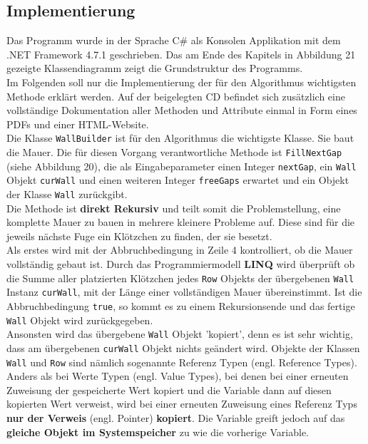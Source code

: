 \documentclass[a4paper,12pt]{article}
\newcommand{\code}{\texttt}
\begin{document}
\subsection{Implementierung}
Das Programm wurde in der Sprache C\# als Konsolen Applikation mit dem .NET Framework 4.7.1 geschrieben.
Das am Ende des Kapitels in Abbildung 21 gezeigte Klassendiagramm zeigt die Grundstruktur des Programms.
\\[0.4cm]
Im Folgenden soll nur die Implementierung der für den Algorithmus wichtigsten Methode erklärt werden. Auf der beigelegten CD befindet sich zusätzlich eine vollständige Dokumentation aller Methoden und Attribute einmal in Form eines PDFs und einer HTML-Website.
\\[0.4cm]
Die Klasse \code{WallBuilder} ist für den Algorithmus die wichtigste Klasse. Sie baut die Mauer. Die für diesen Vorgang verantwortliche Methode ist \code{FillNextGap} (siehe Abbildung 20), die als Eingabeparameter einen Integer \code{nextGap}, ein \code{Wall} Objekt \code{curWall} und einen weiteren Integer \code{freeGaps} erwartet und ein Objekt der Klasse \code{Wall} zurückgibt.
\\[0.4cm]
Die Methode ist \textbf{direkt Rekursiv} und teilt somit die Problemstellung, eine komplette Mauer zu bauen in mehrere kleinere Probleme auf. Diese sind für die jeweils nächste Fuge ein Klötzchen zu finden, der sie besetzt.
\\[0.4cm]
Als erstes wird mit der Abbruchbedingung in Zeile 4 kontrolliert, ob die Mauer vollständig gebaut ist. Durch das Programmiermodell \textbf{LINQ} wird überprüft ob die Summe aller platzierten Klötzchen jedes \code{Row} Objekts der übergebenen \code{Wall} Instanz \code{curWall}, mit der Länge einer vollständigen Mauer übereinstimmt.
Ist die Abbruchbedingung \code{true}, so kommt es zu einem Rekursionsende und das fertige \code{Wall} Objekt wird zurückgegeben.
\\[0.4cm]
Ansonsten wird das übergebene \code{Wall} Objekt 'kopiert', denn es ist sehr wichtig, dass am übergebenen \code{curWall} Objekt nichts geändert wird. Objekte der Klassen \code{Wall} und \code{Row} sind nämlich sogenannte Referenz Typen (engl. Reference Types). Anders als bei Werte Typen (engl. Value Types), bei denen bei einer erneuten Zuweisung der gespeicherte Wert kopiert und die Variable dann auf diesen kopierten Wert verweist, wird bei einer erneuten Zuweisung eines Referenz Typs \textbf{nur der Verweis} (engl. Pointer) \textbf{kopiert}. Die Variable greift jedoch auf das \textbf{gleiche Objekt im Systemspeicher} zu wie die vorherige Variable.
\end{document}
